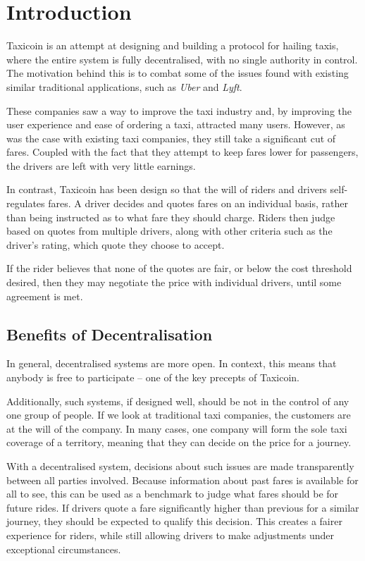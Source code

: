 \section{Introduction}

Taxicoin is an attempt at designing and building a protocol for hailing taxis, where the entire system is fully decentralised, with no single authority in control. The motivation behind this is to combat some of the issues found with existing similar traditional applications, such as \textit{Uber} and \textit{Lyft}.

These companies saw a way to improve the taxi industry and, by improving the user experience and ease of ordering a taxi, attracted many users. However, as was the case with existing taxi companies, they still take a significant cut of fares. Coupled with the fact that they attempt to keep fares lower for passengers, the drivers are left with very little earnings.

In contrast, Taxicoin has been design so that the will of riders and drivers self-regulates fares. A driver decides and quotes fares on an individual basis, rather than being instructed as to what fare they should charge. Riders then judge based on quotes from multiple drivers, along with other criteria such as the driver's rating, which quote they choose to accept.

If the rider believes that none of the quotes are fair, or below the cost threshold desired, then they may negotiate the price with individual drivers, until some agreement is met.

\subsection{Benefits of Decentralisation}

In general, decentralised systems are more open. In context, this means that anybody is free to participate -- one of the key precepts of Taxicoin.

Additionally, such systems, if designed well, should be not in the control of any one group of people. If we look at traditional taxi companies, the customers are at the will of the company. In many cases, one company will form the sole taxi coverage of a territory, meaning that they can decide on the price for a journey.

With a decentralised system, decisions about such issues are made transparently between all parties involved. Because information about past fares is available for all to see, this can be used as a benchmark to judge what fares should be for future rides. If drivers quote a fare significantly higher than previous for a similar journey, they should be expected to qualify this decision. This creates a fairer experience for riders, while still allowing drivers to make adjustments under exceptional circumstances.

